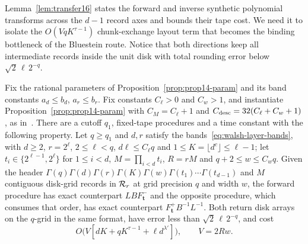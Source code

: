 Lemma~\ref{lem:transfer16} states the forward and inverse synthetic polynomial transforms across the $d-1$ record axes and bounds their tape cost. We need it to isolate the $O(VqK^{\tau-1})$ chunk-exchange layout term that becomes the binding bottleneck of the Bluestein route. Notice that both directions keep all intermediate records inside the unit disk with total rounding error below $\sqrt2\,\ell\,2^{-q}$.

\begin{lemma}\label{lem:transfer16}
Fix the rational parameters of Proposition~\ref{prop:prop14-param} and its band constants $a_d\le b_d$, $a_r\le b_r$.
Fix constants $C_\ell>0$ and $C_w>1$, and instantiate Proposition~\ref{prop:prop14-param} with $C_M=C_\ell+1$ and
$C_{\rm desc}=32(C_\ell+C_w+1)$, as in~\cite[Lemma~16, \S6.2]{OAI26}. There are a cutoff $q_1$, fixed-tape procedures
and a time constant with the following property. Let $q\ge q_1$ and $d,r$ satisfy the bands~\eqref{eq:walsh-layer-bands},
with $d\ge2$, $r=2^\ell$, $2\le\ell<q$, $d\ell\le C_\ell q$ and $1\le K=\lfloor d^c\rfloor\le\ell-1$; let
$t_i\in\{2^{\ell-1},2^\ell\}$ for $1\le i<d$, $M=\prod_{i<d}t_i$, $R=rM$ and $q+2\le w\le C_wq$. Given the header
$\Gamma(q)\Gamma(d)\Gamma(r)\Gamma(K)\Gamma(w)\Gamma(t_1)\cdots\Gamma(t_{d-1})$ and $M$ contiguous disk-grid records in
$\mathcal{R}_r$ at grid precision $q$ and width $w$, the forward procedure has exact counterpart $LBF^-_{\mathbf t}$ and the
opposite procedure, which consumes that order, has exact counterpart $F^+_{\mathbf t}B^{-1}L^{-1}$. Both return disk
arrays on the $q$-grid in the same format, have error less than $\sqrt2\,\ell\,2^{-q}$, and cost
\[
  O\bigl(V[dK+qK^{\tau-1}+\ell d^{\lambda'}]\bigr),\qquad V=2Rw .
\]
\end{lemma}

